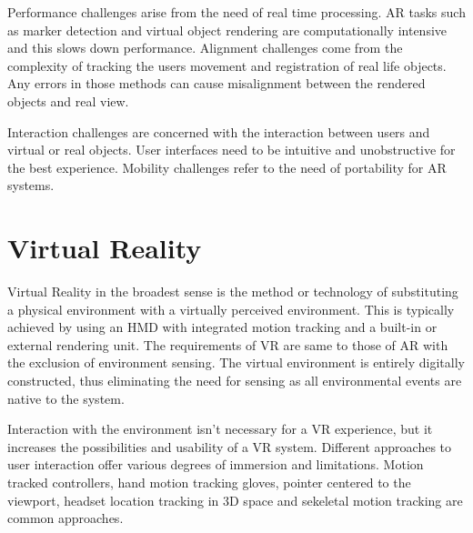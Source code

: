 \documentclass[12pt, a4paper,oneside, nocenter]{thesis}
\begin{document}
Performance challenges arise from the need of real time processing. AR tasks such as marker detection
and virtual object rendering are computationally intensive and this slows down performance.
Alignment challenges come from the complexity of tracking the users movement and registration of real
life objects. Any errors in those methods can cause misalignment between the rendered objects and
real view.\par
Interaction challenges are concerned with the interaction between users and virtual or real objects.
User interfaces need to be intuitive and unobstructive for the best experience. Mobility challenges refer
to the need of portability for AR systems.
\\
\section{Virtual Reality}
Virtual Reality in the broadest sense is the method or technology of substituting a physical environment with a virtually perceived environment.
This is typically achieved by using an HMD with integrated motion tracking and a built-in or external rendering unit.
The requirements of VR are same to those of AR with the exclusion of environment sensing. The virtual environment
is entirely digitally constructed, thus eliminating the need for sensing as all environmental events are native to the system.
\par
Interaction with the environment isn't necessary for a VR experience, but it increases the possibilities and usability of a VR system.
Different approaches to user interaction offer various degrees of immersion and limitations. Motion tracked controllers, hand motion tracking gloves, pointer centered to the viewport, headset location tracking in 3D space and sekeletal motion tracking are common approaches.
\end{document}
